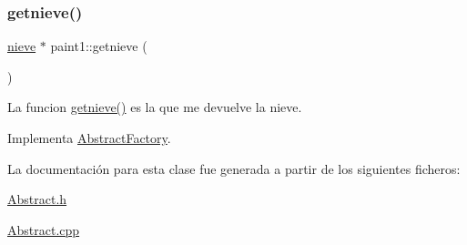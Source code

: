 \mbox{\label{classpaint1_a402a3a74abf9644ba7a19fbb0e97ea4f}} 
\subsubsection{\texorpdfstring{getnieve()}{getnieve()}}
{\footnotesize\ttfamily \hyperlink{classnieve}{nieve} $\ast$ paint1\+::getnieve (\begin{DoxyParamCaption}{ }\end{DoxyParamCaption})\hspace{0.3cm}{\ttfamily [virtual]}}

La funcion \hyperlink{classpaint1_a402a3a74abf9644ba7a19fbb0e97ea4f}{getnieve()} es la que me devuelve la nieve. 

Implementa \hyperlink{classAbstractFactory}{Abstract\+Factory}.



La documentación para esta clase fue generada a partir de los siguientes ficheros\+:\begin{DoxyCompactItemize}
\item 
\hyperlink{Abstract_8h}{Abstract.\+h}\item 
\hyperlink{Abstract_8cpp}{Abstract.\+cpp}\end{DoxyCompactItemize}
